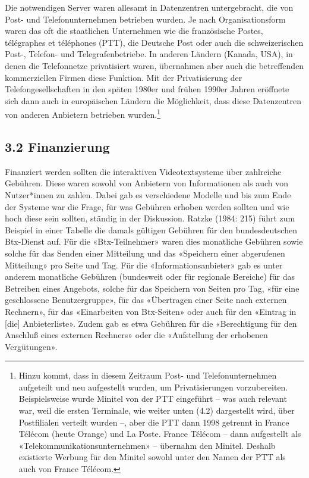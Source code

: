 \documentclass[a4paper,
fontsize=11pt,
oneside,
numbers=noperiodatend,
parskip=half-,
bibliography=totoc,
final
]{scrartcl}
\begin{document}
Die notwendigen Server waren allesamt in Datenzentren untergebracht, die
von Post- und Telefonunternehmen betrieben wurden. Je nach
Organisationsform waren das oft die staatlichen Unternehmen wie die
französische Postes, télégraphes et téléphones (PTT), die Deutsche Post
oder auch die schweizerischen Post-, Telefon- und Telegrafenbetriebe. In
anderen Ländern (Kanada, USA), in denen die Telefonnetze privatisiert
waren, übernahmen aber auch die betreffenden kommerziellen Firmen diese
Funktion. Mit der Privatisierung der Telefongesellschaften in den späten
1980er und frühen 1990er Jahren eröffnete sich dann auch in europäischen
Ländern die Möglichkeit, dass diese Datenzentren von anderen Anbietern
betrieben wurden.\footnote{Hinzu kommt, dass in diesem Zeitraum Post-
  und Telefonunternehmen aufgeteilt und neu aufgestellt wurden, um
  Privatisierungen vorzubereiten. Beispielsweise wurde Minitel von der
  PTT eingeführt -- was auch relevant war, weil die ersten Terminale,
  wie weiter unten (4.2) dargestellt wird, über Postfilialen verteilt
  wurden --, aber die PTT dann 1998 getrennt in France Télécom (heute
  Orange) und La Poste. France Télécom -- dann aufgestellt als
  «Telekommunikationsunternehmen» -- übernahm den Minitel. Deshalb
  existierte Werbung für den Minitel sowohl unter den Namen der PTT als
  auch von France Télécom.}

\hypertarget{finanzierung}{%
\subsection{3.2 Finanzierung}\label{finanzierung}}

Finanziert werden sollten die interaktiven Videotextsysteme über
zahlreiche Gebühren. Diese waren sowohl von Anbietern von Informationen
als auch von Nutzer*innen zu zahlen. Dabei gab es verschiedene Modelle
und bis zum Ende der Systeme war die Frage, für was Gebühren erhoben
werden sollten und wie hoch diese sein sollten, ständig in der
Diskussion. Ratzke (1984: 215) führt zum Beispiel in einer Tabelle die
damals gültigen Gebühren für den bundesdeutschen Btx-Dienst auf. Für die
«Btx-Teilnehmer» waren dies monatliche Gebühren sowie solche für das
Senden einer Mitteilung und das «Speichern einer abgerufenen Mitteilung»
pro Seite und Tag. Für die «Informationsanbieter» gab es unter anderem
monatliche Gebühren (bundesweit oder für regionale Bereiche) für das
Betreiben eines Angebots, solche für das Speichern von Seiten pro Tag,
«für eine geschlossene Benutzergruppe», für das «Übertragen einer Seite
nach externen Rechnern», für das «Einarbeiten von Btx-Seiten» oder auch
für den «Eintrag in {[}die{]} Anbieterliste». Zudem gab es etwa Gebühren
für die «Berechtigung für den Anschluß eines externen Rechners» oder die
«Aufstellung der erhobenen Vergütungen».
\end{document}
